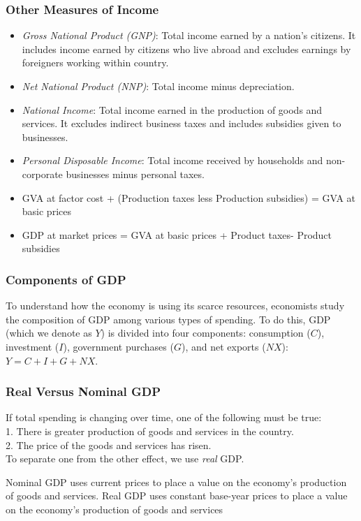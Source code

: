 \documentclass[shownotes,11pt, aspectratio=169]{beamer}
\begin{document}
\begin{frame}
\frametitle{Other Measures of Income}

\begin{itemize}

\item \textit{Gross National Product (GNP)}: Total income earned by a nation's citizens. It includes income earned by citizens who live abroad and excludes earnings by foreigners working within country.
\item \textit{Net National Product (NNP)}: Total income minus depreciation. 
\item \textit{National Income}:  Total income earned in the production of goods and services. It excludes indirect business taxes and includes subsidies given to businesses.
\item \textit{Personal Disposable Income}: Total income received by households and non-corporate businesses minus personal taxes.
\pause
\item  GVA  at factor cost + (Production taxes less Production subsidies) = GVA at basic  prices
\item  GDP  at market prices = GVA at basic prices + Product taxes- Product subsidies

\end{itemize}
\end{frame}



\begin{frame}
\frametitle{Components of GDP}
To understand how the economy is using its scarce resources, economists study
the composition of GDP among various types of spending. To do this, GDP (which
we denote as $Y$) is divided into four components: consumption ($C$), investment ($I$),
government purchases ($G$), and net exports ($NX$): \\
$Y = C + I + G + NX$.
\end{frame}




\begin{frame}
\frametitle{Real Versus Nominal GDP}

If total spending is changing over time, one of the following must be true: \\
1. There is greater production of goods and services in the country.  \\
2. The price of the goods and services has risen. \\
To separate one from the other effect, we use \textit{real} GDP. \\
\pause

\vspace{3mm}

Nominal GDP uses current prices to place a value on the economy's production
of goods and services. Real GDP uses constant base-year prices to place a value on
the economy's production of goods and services
\end{frame}
\end{document}
